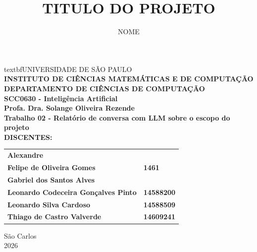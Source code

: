 \documentclass[
article,
hidelinks,
12pt,
openright,
oneside, %
a4paper,
sumario = tradicional,
brazil
]{abntex2}
\title{TITULO DO PROJETO}%
\author{NOME}%
\begin{document}
\pagestyle{empty}
\begin{center}
textbf{UNIVERSIDADE DE SÃO PAULO}\\
\textbf{INSTITUTO DE CIÊNCIAS MATEMÁTICAS E DE COMPUTAÇÃO}\\
\textbf{DEPARTAMENTO DE CIÊNCIAS DE COMPUTAÇÃO}\\
\vspace{1.5cm}
\textbf{SCC0630 - Inteligência Artificial\\Profa. Dra. Solange Oliveira Rezende}\\
\vspace{3.5cm}
{\fontsize{18pt}{22.5pt}\selectfont \textbf{Trabalho 02 - Relatório de conversa com LLM sobre o escopo do projeto}}\\

\vspace{3.5cm}
\noindent\textbf{DISCENTES:}

\vspace{1cm}

\hspace*{5.8cm} %
\begin{tabular}{@{}l l@{}}
\textbf{Alexandre} & \textbf{} \\
\textbf{Felipe de Oliveira Gomes} & \textbf{1461} \\
\textbf{Gabriel dos Santos Alves} & \textbf{} \\
\textbf{Leonardo Codeceira Gonçalves Pinto} & \textbf{14588200} \\
\textbf{Leonardo Silva Cardoso} & \textbf{14588509} \\
\textbf{Thiago de Castro Valverde} & \textbf{14609241} \\
\end{tabular}
\vfill
\begin{center}
{São Carlos\\2026}  
\end{center}
\end{center}
\end{document}
